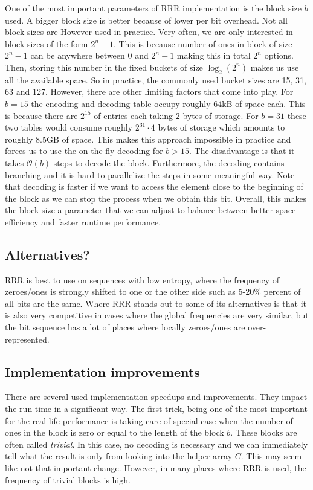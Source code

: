 One of the most important parameters of RRR implementation is the block
size $b$ used. A bigger block size is better because of lower per bit overhead. Not
all block sizes are However used in practice. Very often, we are only interested in
block sizes of the form $2^n-1$. This is because number of ones in block of size $2^n-1$
can be anywhere between $0$ and $2^n-1$ making this in total $2^n$ options. Then, storing
this number in the fixed buckets of size $\log_2(2^n)$ makes us use all the available space.
So in practice, the commonly used bucket sizes are 15, 31, 63 and 127. However, there are
other limiting factors that come into play. For $b=15$ the encoding and decoding table
occupy roughly 64kB of space each. This is because there are $2^{15}$ of entries each taking
2 bytes of storage. For $b=31$ these two tables would consume roughly $2^{31}\cdot 4$ bytes
of storage which amounts to roughly 8.5GB of space. This makes this approach impossible in
practice and forces us to use the on the fly decoding for $b>15$. The disadvantage
is that it takes $\mathcal{O}(b)$ steps to decode the block. Furthermore, the decoding
contains branching and it is hard to parallelize the steps in some meaningful way.
Note that decoding is faster if we want to access the element close to the beginning of
the block as we can stop the process when we obtain this bit. Overall, this makes the block
size a parameter that we can adjust to balance between better space efficiency and faster
runtime performance.


\subsection{Alternatives?}

RRR is best to use on sequences with low entropy, where the frequency of zeroes/ones is
strongly shifted to one or the other side such as 5-20\% percent of all bits are the same.
Where RRR stands out to some of its alternatives is that it is also very competitive in
cases where the global frequencies are very similar, but the bit sequence has a lot of places
where locally zeroes/ones are over-represented.

\subsection{Implementation improvements}

There are several used implementation speedups and improvements. They impact the run time in a
significant way. The first trick, being one of the most important for the real
life performance is taking care of special case when the number of ones in the block is zero
or equal to the length of the block $b$. These blocks are often called \textit{trivial}. In this
case, no decoding is necessary and we can immediately tell what the result is only from looking
into the helper array $C$. This may seem like not that important change. However, in many places
where RRR is used, the frequency of trivial blocks is high.

